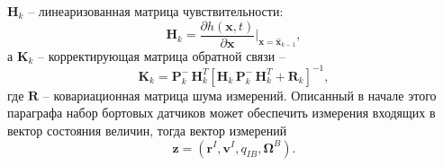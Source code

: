 ${{\bm{H}}_k}$ -- линеаризованная матрица чувствительности:
\begin{equation}
{\bm{H}}_k = \frac{\partial {h}({\bm{x}},t)}{\partial {\bm{x}}} \Bigg|_{\bm x = {{\bm{\hat x}}_{k - 1}}},
\end{equation}
а ${{\bm{K}}_k}$ -- корректирующая матрица обратной связи --
$${{\bm{K}}_k} = {\bm{P}}_k^ - \,{\bm{H}}_k^T{\left[ {{{\bm{H}}_k}\,{\bm{P}}_k^ - \,{\bm{H}}_k^T + {{\bm{R}}_k}} \right]^{ - 1}},$$
где $\bm R$ -- ковариационная матрица шума измерений. Описанный в начале этого параграфа набор бортовых датчиков может обеспечить измерения входящих в вектор состояния величин, тогда вектор измерений
\begin{equation} \label{eq:ukf_mes}
\bm z = (\bm r^I, \bm v^I, q_{IB},\bm \Omega^B).
\end{equation}

